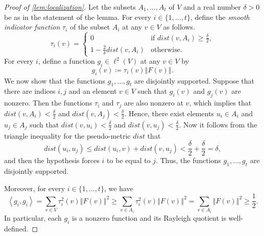 \documentclass[12pt,a4paper,bold]{thesis}
\theoremstyle{definition}
\newcommand*{\ip}[2]{\left\langle #1 , #2 \right\rangle}
\newcommand*{\norm}[2][]{\left\Vert #2 \right\Vert_{#1}}
\begin{document}
\begin{proof}[Proof of \cref{lem:localization}]
    Let the subsets $A_1, \dots, A_t$ of $V$ and a real number $\delta > 0$ be as in 
    the statement of the lemma. For every $i \in \{1, \dots, t\}$, define the 
    \emph{smooth indicator function} $\tau_i$ of the subset $A_i$ at any $v \in V$ as follows.
    \begin{equation*}
        \tau_i(v) =
        \begin{cases}
            0
            & \text{if } dist(v, A_i) \geq \frac{\delta}{2},
            \\
            1 - \frac{2}{\delta} dist(v, A_i)
            & \text{otherwise}.
        \end{cases}
    \end{equation*}
    For every $i$, define a function $g_i \in \ell^2(V)$ at any $v \in V$ by
    \begin{equation*}
        g_i(v) \coloneq \tau_i(v) \norm{F(v)}.
    \end{equation*} 
    We now show that the functions $g_1, \dots, g_t$ are disjointly supported.
    Suppose that there are indices $i, j$ and an element $v \in V$ such that 
    $g_i(v)$ and $g_j(v)$ are nonzero. Then the functions $\tau_i$ and $\tau_j$
    are also nonzero at $v$, which implies that $dist(v, A_i) < \frac{\delta}{2}$ 
    and $dist(v, A_j) < \frac{\delta}{2}$. Hence, there exist elements $u_i \in A_i$
    and $u_j \in A_j$ such that $dist(v, u_i) < \frac{\delta}{2}$ and $dist(v, u_j) 
    < \frac{\delta}{2}$. Now it follows from the triangle inequality for the pseudo-metric 
    $dist$ that
    \begin{equation*}
        dist(u_i, u_j) \leq dist(u_i, v) + dist(v, u_j) < \frac{\delta}{2} + \frac{\delta}{2} = \delta,
    \end{equation*}
    and then the hypothesis forces $i$ to be equal to $j$. Thus, the functions
    $g_1, \dots, g_t$ are disjointly supported. 

    Moreover, for every $i \in \{1, \dots, t\}$, we have
    \begin{equation*}
        \ip{g_i}{g_i} = \sum_{v \in V} \tau_i^2(v) \norm{F(v)}^2 
        \geq \sum_{v \in A_i} \tau_i^2(v) \norm{F(v)}^2 = \sum_{v \in A_i} \norm{F(v)}^2
        \geq \frac{1}{2}.
    \end{equation*}
    In particular, each $g_i$ is a nonzero function and its Rayleigh quotient is well-defined. 
    

\end{proof}
\end{document}
